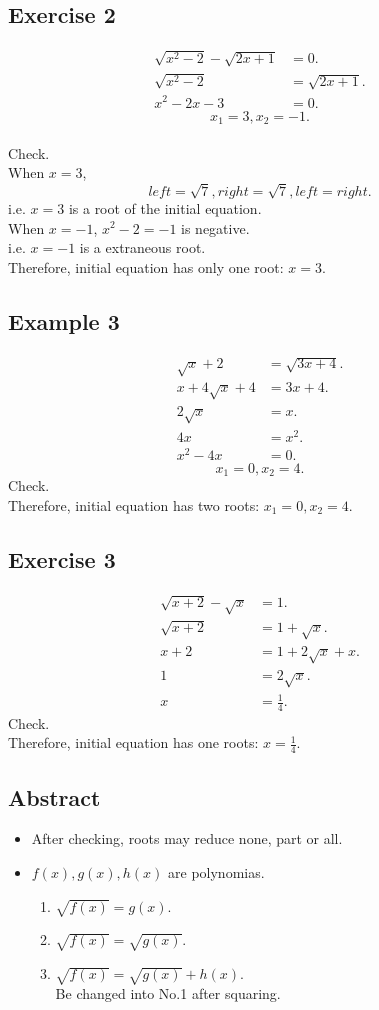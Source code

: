 \begin{CJK}{UTF8}{gkai}
\subsection{Exercise 2}
\begin{align*}
\sqrt{x^2-2}-\sqrt{2x+1}&=0.\\
\sqrt{x^2-2}&=\sqrt{2x+1}.\\
x^2-2x-3&=0.
\end{align*}
$$x_1=3, x_2=-1.$$
\\Check.
\\When $x=3$,
$$left=\sqrt{7},  right=\sqrt{7}, left= right.$$
i.e. $x=3$ is a root of the initial equation.
\\When $x=-1$, $x^2-2=-1$ is negative.
\\i.e. $x=-1$ is a extraneous root.
\\Therefore, initial equation has only one root: $x=3.$

\subsection{Example 3}
\begin{align*}
\sqrt{x}+2&=\sqrt{3x+4}.\\
x+4\sqrt{x}+4&=3x+4.\\
2\sqrt{x}&=x.\\
4x&=x^2.\\
x^2-4x&=0.
\end{align*}
$$x_1=0, x_2=4.$$
Check.
\\Therefore, initial equation has two roots: $x_1=0, x_2=4.$

\subsection{Exercise 3}
\begin{align*}
\sqrt{x+2}-\sqrt{x}&=1.\\
\sqrt{x+2}&=1+\sqrt{x}.\\
x+2&=1+2\sqrt{x}+x.\\
1&=2\sqrt{x}.\\
x&=\frac{1}{4}.
\end{align*}
Check.
\\Therefore, initial equation has one roots: $x=\frac{1}{4}.$

\subsection{Abstract}
\begin{itemize}
\item After checking, roots may reduce none, part or all.
\item $f(x), g(x), h(x)$ are polynomias.
\begin{enumerate}
\item $\sqrt{f(x)}=g(x).$
\item $\sqrt{f(x)}=\sqrt{g(x)}.$
\item $\sqrt{f(x)}=\sqrt{g(x)}+h(x).$ \\Be changed into No.1 after squaring.
\end{enumerate}
\end{itemize}


\end{CJK}
